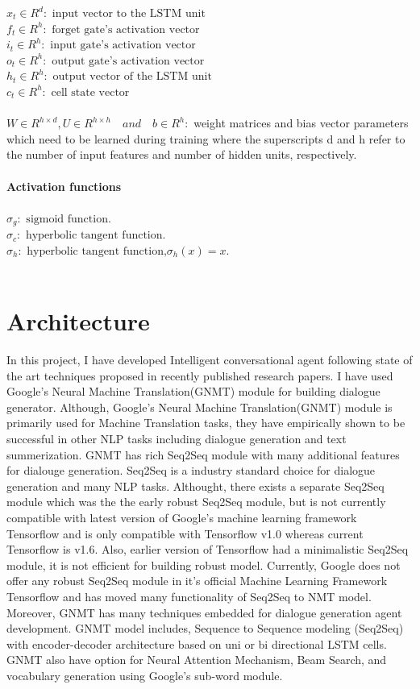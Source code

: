 \documentclass[a4paper,12pt]{report}
\begin{document}
$x_{t}\in R^{d} : \text{ input vector to the LSTM unit}$\\
$f_{t}\in R^{h} : \text{ forget gate's activation vector}$\\
$i_{t}\in R^{h} : \text{ input gate's activation vector}$\\
$o_{t}\in R^{h} : \text{ output gate's activation vector}$\\
$h_{t}\in R^{h} : \text{ output vector of the LSTM unit}$\\
$c_{t}\in R^{h} : \text{ cell state vector}$\\\\
$W\in R^{h\times d}, U\in R^{h\times h} \quad and \quad b\in R^{h} :$ weight matrices and bias vector parameters which need to be learned during training where the superscripts d and h refer to the number of input features and number of hidden units, respectively.\\\\
\textbf{Activation functions}\\\\
$\sigma _{g} : \text{ sigmoid function.}$\\
$\sigma_c : \text{ hyperbolic tangent function.}$\\
$\sigma _{h} : \text{ hyperbolic tangent function,} \sigma _{h}(x)=x$.\\\\

{\let\clearpage\relax \chapter {Architecture}}
\noindent In this project, I have developed Intelligent conversational agent following state of the art techniques proposed in recently published research papers. I have used Google's Neural Machine Translation(GNMT) module for building dialogue generator. Although, Google's Neural Machine Translation(GNMT) module is primarily used for Machine Translation tasks, they have empirically shown to be successful in other NLP tasks including dialogue generation and text summerization. GNMT has rich Seq2Seq module with many additional features for dialouge generation. Seq2Seq is a industry standard choice for dialogue generation and many NLP tasks. Althought, there exists a separate Seq2Seq module\cite{seq2seq} which was the the early robust Seq2Seq module, but is not currently compatible with latest version of Google's machine learning framework Tensorflow and is only compatible with Tensorflow v1.0 whereas current Tensorflow is v1.6. Also, earlier version of Tensorflow had a minimalistic Seq2Seq module, it is not efficient for building robust model. Currently, Google does not offer any robust Seq2Seq module in it's official Machine Learning Framework Tensorflow and has moved many functionality of Seq2Seq to NMT model. Moreover, GNMT has many techniques embedded for dialogue generation agent development. GNMT model includes, Sequence to Sequence modeling (Seq2Seq) with encoder-decoder architecture based on uni or bi directional LSTM cells. GNMT also have option for Neural Attention Mechanism, Beam Search, and vocabulary generation using Google's sub-word module.\\
\end{document}
